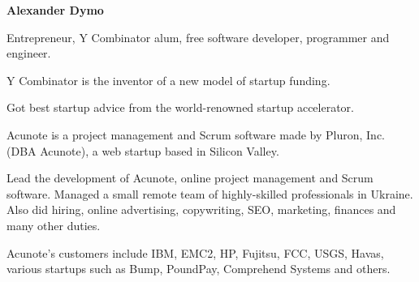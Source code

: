 \documentclass[10pt]{letter}
\begin{document}
{\large\centering\textbf{Alexander Dymo}\\}

\address
{
  \texttt{alex@alexdymo.com} \\
  +380 67 5122801 \\
  Mykolayiv, Ukraine \\
}


\begin{llist}

  \vspace{.30in}                %


             Entrepreneur, Y Combinator alum, free software developer,
             programmer and engineer.



  \startexperience

           \item Y Combinator is the inventor of a new model of startup funding.

           \item Got best startup advice from the world-renowned startup accelerator.

  \endexperience


  \startexperience

           \item Acunote is a project management and Scrum software made by Pluron, Inc.
           (DBA Acunote), a web startup based in Silicon Valley.

           \item Lead the development of Acunote, online project management
           and Scrum software. Managed a small remote team of highly-skilled
           professionals in Ukraine. Also did hiring, online advertising,
           copywriting, SEO, marketing, finances and many other duties.

           \item Acunote's customers include IBM, EMC2, HP, Fujitsu, FCC, USGS, Havas,
           various startups such as Bump, PoundPay, Comprehend Systems and others.


\end{llist}
\end{document}
